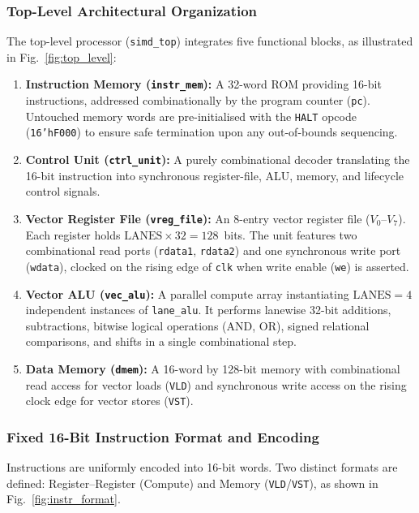 \subsubsection{Top-Level Architectural Organization}
The top-level processor (\texttt{simd\_top}) integrates five functional blocks, as illustrated in Fig.~\ref{fig:top_level}:
\begin{enumerate}
  \item \textbf{Instruction Memory (\texttt{instr\_mem}):} A 32-word ROM providing 16-bit instructions, addressed combinationally by the program counter (\texttt{pc}). Untouched memory words are pre-initialised with the \texttt{HALT} opcode (\texttt{16'hF000}) to ensure safe termination upon any out-of-bounds sequencing.
  \item \textbf{Control Unit (\texttt{ctrl\_unit}):} A purely combinational decoder translating the 16-bit instruction into synchronous register-file, ALU, memory, and lifecycle control signals.
  \item \textbf{Vector Register File (\texttt{vreg\_file}):} An 8-entry vector register file ($V_0$--$V_7$). Each register holds $\text{LANES} \times 32 = 128$~bits. The unit features two combinational read ports (\texttt{rdata1}, \texttt{rdata2}) and one synchronous write port (\texttt{wdata}), clocked on the rising edge of \texttt{clk} when write enable (\texttt{we}) is asserted.
  \item \textbf{Vector ALU (\texttt{vec\_alu}):} A parallel compute array instantiating $\text{LANES}=4$ independent instances of \texttt{lane\_alu}. It performs lanewise 32-bit additions, subtractions, bitwise logical operations (AND, OR), signed relational comparisons, and shifts in a single combinational step.
  \item \textbf{Data Memory (\texttt{dmem}):} A 16-word by 128-bit memory with combinational read access for vector loads (\texttt{VLD}) and synchronous write access on the rising clock edge for vector stores (\texttt{VST}).
\end{enumerate}

\subsubsection{Fixed 16-Bit Instruction Format and Encoding}
Instructions are uniformly encoded into 16-bit words. Two distinct formats are defined: Register--Register (Compute) and Memory (\texttt{VLD}/\texttt{VST}), as shown in Fig.~\ref{fig:instr_format}.

